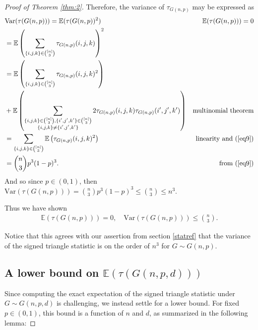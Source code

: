 \documentclass{article}
\begin{document}
\begin{proof}[Proof of Theorem \ref{thm:2}]
Therefore, the variance of $\tau_{G(n,p)}$ may be expressed as
\begin{align*}
    &\text{Var}(\tau(G(n,p))) = \mathbb{E}(\tau(G(n,p))^2) & \mathbb{E}(\tau(G(n,p))) = 0\\
    &= \mathbb{E} \left( \sum\limits_{ \{i,j,k\} \in \binom{[n]}{3}} \tau_{G(n,p)}(i,j,k) \right)^2\\
    &= \mathbb{E} \left( \sum\limits_{ \{i,j,k\} \in \binom{[n]}{3}} \tau_{G(n,p)}(i,j,k)^2 \right)\\
    &+  \mathbb{E}\left(\sum\limits_{\substack{\{i,j,k\} \in \binom{[n]}{3}, \{i',j',k'\} \in \binom{[n]}{3}\\ \{i,j,k\} \neq \{i',j',k'\}}} 2\tau_{G(n,p)}(i,j,k) \tau_{G(n,p)}(i',j',k') \right) & \text{multinomial theorem}\\
    &= \sum\limits_{ \{i,j,k\} \in \binom{[n]}{3}} \mathbb{E}\left(\tau_{G(n,p)}(i,j,k)^2\right) & \text{linearity and (\ref{eq9})}\\ 
    &= \binom{n}{3}p^3(1-p)^3. & \text{from (\ref{eq9})}
\end{align*}
And so since $p \in (0,1)$, then $\text{Var}(\tau(G(n,p))) =  \binom{n}{3}p^3(1-p)^3 \leq \binom{n}{3} \leq n^3$.

Thus we have shown
\begin{align}
    \mathbb{E}(\tau(G(n,p))) = 0, \quad \text{Var}(\tau(G(n,p))) \leq \binom{n}{3}\label{eq25}.
\end{align}

Notice that this agrees with our assertion from section \ref{statref} that the variance of the signed triangle statistic is on the order of $n^3$ for $G \sim G(n, p)$.

\subsection{A lower bound on $\mathbb{E}(\tau(G(n,p,d)))$}

Since computing the exact expectation of the signed triangle statistic under $G \sim G(n,p,d)$ is challenging, we instead settle for a lower bound. For fixed $p \in (0,1)$, this bound is a function of $n$ and $d$, as summarized in the following lemma:


\end{proof}
\end{document}
